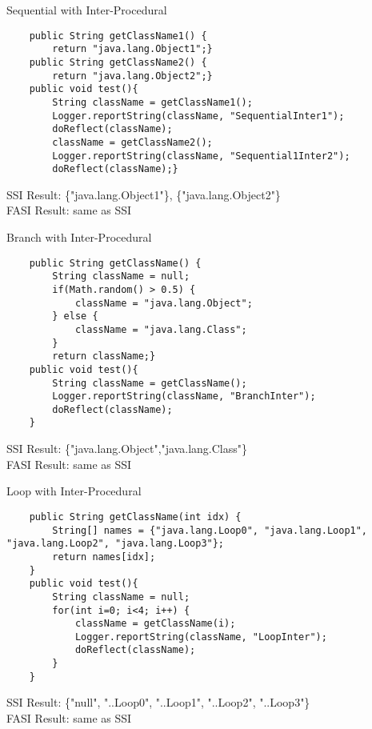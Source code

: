 \documentclass{beamer}
\begin{document}
\begin{frame}[fragile]{Sequential with Inter-Procedural}
\begin{lstlisting}
    public String getClassName1() {
        return "java.lang.Object1";}
    public String getClassName2() {
        return "java.lang.Object2";}
    public void test(){
        String className = getClassName1();
        Logger.reportString(className, "SequentialInter1");
        doReflect(className);
        className = getClassName2();
        Logger.reportString(className, "Sequential1Inter2"); 
        doReflect(className);}
\end{lstlisting}
SSI Result: \{"java.lang.Object1"\}, \{"java.lang.Object2"\} \checkmark\\
FASI Result: same as SSI \checkmark
\end{frame}

\begin{frame}[fragile]{Branch with Inter-Procedural}
\begin{lstlisting}
    public String getClassName() {
        String className = null;
        if(Math.random() > 0.5) {
            className = "java.lang.Object";
        } else {
            className = "java.lang.Class";
        }
        return className;}
    public void test(){
        String className = getClassName();
        Logger.reportString(className, "BranchInter");
        doReflect(className);
    }
\end{lstlisting}
SSI Result: \{"java.lang.Object","java.lang.Class"\} \checkmark\\
FASI Result: same as SSI \checkmark
\end{frame}

\begin{frame}[fragile]{Loop with Inter-Procedural}
\begin{lstlisting}
    public String getClassName(int idx) {
        String[] names = {"java.lang.Loop0", "java.lang.Loop1", "java.lang.Loop2", "java.lang.Loop3"};
        return names[idx];
    }
    public void test(){
        String className = null;
        for(int i=0; i<4; i++) {
            className = getClassName(i);
            Logger.reportString(className, "LoopInter");
            doReflect(className);
        }
    }
\end{lstlisting}
SSI Result: \{"null", "..Loop0", "..Loop1", "..Loop2", "..Loop3"\} \checkmark\\
FASI Result: same as SSI \checkmark
\end{frame}
\end{document}
